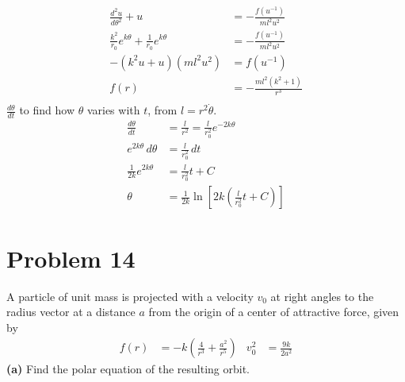 \documentclass[]{article}
\newcommand{\bd}{\textbf}
\begin{document}
	\begin{equation}
		\begin{split}
			\frac{d^2u}{d\theta^2} + u &= -\frac{f(u^{-1})}{ml^2u^2} \\
			\frac{k^2}{r_0} e^{k\theta} + \frac{1}{r_0} e^{k\theta} &= -\frac{f(u^{-1})}{ml^2u^2} \\
			-(k^2 u + u)(ml^2u^2) &= f(u^{-1}) \\
			f(r) &= -\frac{ml^2(k^2 + 1)}{r^3} \\
		\end{split}
	\end{equation}
	$ \frac{d\theta}{dt} $ to find how $ \theta $ varies with $ t $, from $ l = r^2 \dot{\theta} $.
	\begin{equation}
		\begin{split}
			\frac{d\theta}{dt} &= \frac{l}{r^2} = \frac{l}{r_0^2} e^{-2k\theta} \\
			e^{2k\theta} \, d\theta &= \frac{l}{r_0^2} \, dt \\
			\frac{1}{2k} e^{2k\theta} &= \frac{l}{r_0^2}t + C \\
			\theta &= \frac{1}{2k} \ln \left[ 2k\left(\frac{l}{r_0^2}t + C\right) \right]
		\end{split}
	\end{equation}
	\section{Problem 14}
	
	A particle of unit mass is projected with a velocity $ v_0 $ at right angles to the radius vector at a distance $ a $ from the origin of a center of attractive force, given by
	\begin{equation}
		\begin{aligned}
			f(r) &= -k \left( \frac{4}{r^3} + \frac{a^2}{r^5} \right) & v_0^2 &= \frac{9k}{2a^2}
		\end{aligned}
	\end{equation}
	\bd{(a)} Find the polar equation of the resulting orbit. \\
	
\end{document}
